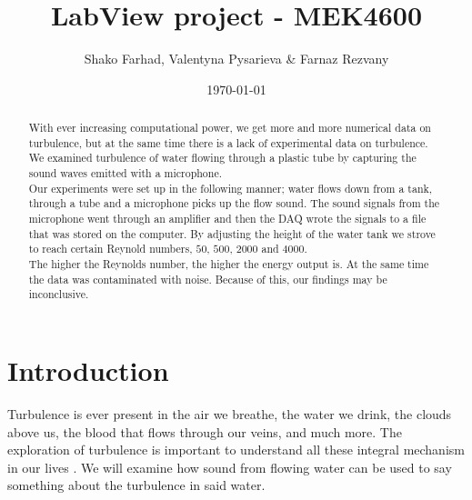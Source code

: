 \documentclass[english,a4paper,12pt]{article}
\title{LabView project - MEK4600}
\author{Shako Farhad, Valentyna Pysarieva \& Farnaz Rezvany}
\date{\today}
\begin{document}
 
 
\lstset{style=mystyle}

\maketitle

\begin{abstract}
With ever increasing computational power, we get more and more numerical data on turbulence, but at the same time there is a lack of experimental data on turbulence. We examined turbulence of water flowing through a plastic tube by capturing the sound waves emitted with a microphone. \\
Our experiments were set up in the following manner; water flows down from a tank, through a tube and a microphone picks up the flow sound. The sound signals from the microphone went through an amplifier and then the DAQ wrote the signals to a file that was stored on the computer. By adjusting the height of the water tank we strove to reach certain Reynold numbers, $50$, $500$, $2000$ and $4000$. \\
The higher the Reynolds number, the higher the energy output is. At the same time the data was contaminated with noise. Because of this, our findings may be inconclusive.

\end{abstract}

\section*{Introduction}
Turbulence is ever present in the air we breathe, the water we drink, the clouds above us, the blood that flows through our veins, and much more. The exploration of turbulence is important to understand all these integral mechanism in our lives \cite{Turbulence}. We will examine how sound from flowing water can be used to say something about the turbulence in said water.\bigskip
\end{document}

